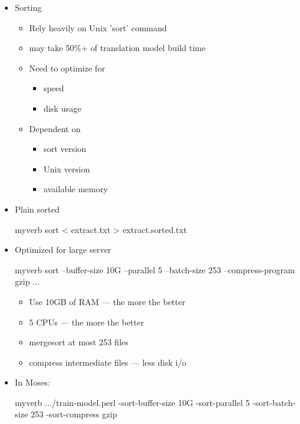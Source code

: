 \documentclass[landscape]{uedslides2C}
\begin{document}
\vspace{10mm}
\begin{itemize} \itemsep -1mm
\item {Sorting}
  \begin{itemize}
  \item Rely heavily on Unix 'sort' command
    \item may take 50\%+ of translation model build time 
  \item Need to optimize for
     \begin{itemize}
      \item speed
      \item disk usage
     \end{itemize}

  \item Dependent on
    \begin{itemize}
    \item      sort version
    \item      Unix version
    \item      available memory
    \end{itemize}
  \end{itemize}
\end{itemize}


\vspace{-5mm}
  \begin{itemize} \itemsep -1mm 
  \item Plain sorted\\[2mm]
  \begin{SaveVerbatim}{myverb}
 sort < extract.txt > extract.sorted.txt
  \end{SaveVerbatim}
  \colorbox{gray}{}

  \item Optimized for large server\\[2mm]
  \begin{SaveVerbatim}{myverb}
 sort --buffer-size 10G --parallel 5
      --batch-size 253 --compress-program gzip ...
  \end{SaveVerbatim}
  \colorbox{gray}{}
    \begin{itemize}
    \item Use 10GB of RAM --- the more the better
    \item 5 CPUs --- the more the better
    \item merge\-sort at most 253 files
    \item compress intermediate files --- less disk i/o
    \end{itemize}

\item In Moses:\\[2mm]
    \begin{SaveVerbatim}{myverb}
 .../train-model.perl -sort-buffer-size 10G -sort-parallel 5 
      -sort-batch-size 253 -sort-compress gzip 
    \end{SaveVerbatim}
    \colorbox{gray}{}

  \end{itemize}
\end{document}
